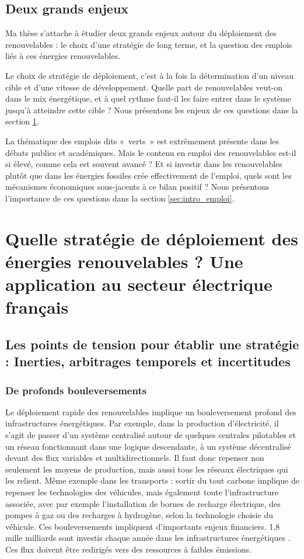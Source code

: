 \subsection{Deux grands enjeux}
Ma thèse s’attache à étudier deux grands enjeux autour du déploiement des renouvelables : le choix d’une stratégie de long terme, et la question des emplois liés à ces énergies renouvelables.

Le choix de stratégie de déploiement, c’est à la fois la détermination d’un niveau cible et d’une vitesse de développement. Quelle part de renouvelables veut-on dans le mix énergétique, et à quel rythme faut-il les faire entrer dans le système jusqu’à atteindre cette cible ? 
Nous présentons les enjeux de ces questions dans la section \ref{sec:intro_renouvelables}.

La thématique des emplois dits «~verts~» est extrêmement présente dans les débats publics et académiques. Mais le contenu en emploi des renouvelables est-il si élevé, comme cela est souvent avancé ? Et si investir dans les renouvelables plutôt que dans les énergies fossiles crée effectivement de l’emploi, quels sont les mécanismes économiques sous-jacents à ce bilan positif ? Nous présentons l’importance de ces questions dans la section \ref{sec:intro_emploi}.



\section{Quelle stratégie de déploiement des énergies renouvelables ? Une application au secteur électrique français}

\label{sec:intro_renouvelables}

\subsection{Les points de tension pour établir une stratégie : Inerties, arbitrages temporels et incertitudes}
\subsubsection{De profonds bouleversements}
Le déploiement rapide des renouvelables implique un bouleversement profond des infrastructures énergétiques. Par exemple, dans la production d’électricité, il s’agit de passer d’un système centralisé autour de quelques centrales pilotables et un réseau fonctionnant dans une logique descendante, à un système décentralisé devant des flux variables et multidirectionnels. Il faut donc repenser non seulement les moyens de production, mais aussi tous les réseaux électriques qui les relient.
Même exemple dans les transports : sortir du tout carbone implique de repenser les technologies des véhicules, mais également toute l’infrastructure associée, avec par exemple l’installation de bornes de recharge électrique, des pompes à gaz ou des recharges à hydrogène, selon la technologie choisie du véhicule.
Ces bouleversements impliquent d’importants enjeux financiers. 1,8 mille milliards sont investis chaque année dans les infrastructures énergétiques \citep{IEAWIR2016}. Ces flux doivent être redirigés vers des ressources à faibles émissions. 

